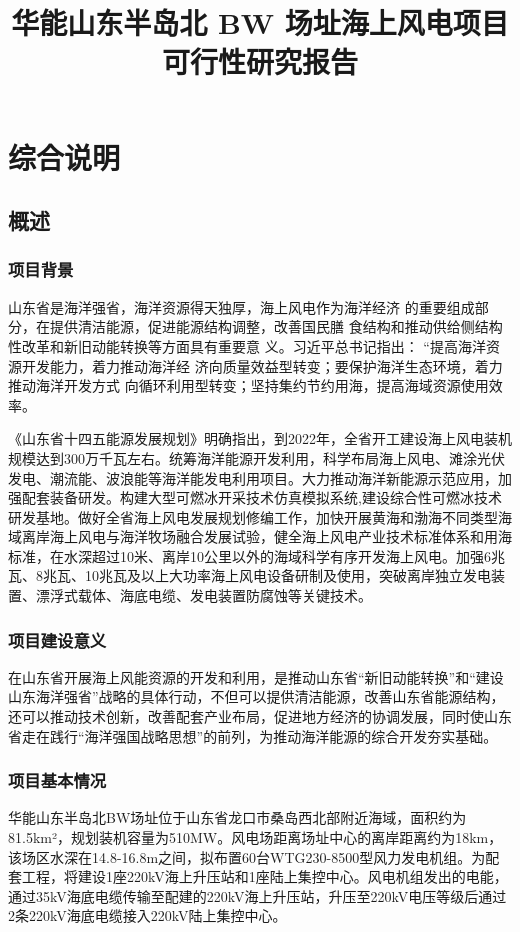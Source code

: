 \documentclass[12pt, letterpaper]{article}
\title{ \textbf{华能山东半岛北 BW 场址海上风电项目} \\
	可行性研究报告}
\begin{document}
	
	\maketitle
	
	\tableofcontents
	
	\section{综合说明}
	\subsection{概述}
	\subsubsection{项目背景}
	山东省是海洋强省，海洋资源得天独厚，海上风电作为海洋经济
	的重要组成部分，在提供清洁能源，促进能源结构调整，改善国民膳
	食结构和推动供给侧结构性改革和新旧动能转换等方面具有重要意
	义。习近平总书记指出： “提高海洋资源开发能力，着力推动海洋经
	济向质量效益型转变；要保护海洋生态环境，着力推动海洋开发方式
	向循环利用型转变；坚持集约节约用海，提高海域资源使用效率。
	
	
	《山东省十四五能源发展规划》明确指出，到2022年，全省开工建设海上风电装机规模达到300万千瓦左右。统筹海洋能源开发利用，科学布局海上风电、滩涂光伏发电、潮流能、波浪能等海洋能发电利用项目。大力推动海洋新能源示范应用，加强配套装备研发。构建大型可燃冰开采技术仿真模拟系统,建设综合性可燃冰技术研发基地。做好全省海上风电发展规划修编工作，加快开展黄海和渤海不同类型海域离岸海上风电与海洋牧场融合发展试验，健全海上风电产业技术标准体系和用海标准，在水深超过10米、离岸10公里以外的海域科学有序开发海上风电。加强6兆瓦、8兆瓦、10兆瓦及以上大功率海上风电设备研制及使用，突破离岸独立发电装置、漂浮式载体、海底电缆、发电装置防腐蚀等关键技术。
	
	\subsubsection{项目建设意义}
	在山东省开展海上风能资源的开发和利用，是推动山东省“新旧动能转换”和“建设山东海洋强省”战略的具体行动，不但可以提供清洁能源，改善山东省能源结构，还可以推动技术创新，改善配套产业布局，促进地方经济的协调发展，同时使山东省走在践行“海洋强国战略思想”的前列，为推动海洋能源的综合开发夯实基础。
	
	\subsubsection{项目基本情况}
	华能山东半岛北BW场址位于山东省龙口市桑岛西北部附近海域，面积约为81.5km²，规划装机容量为510MW。风电场距离场址中心的离岸距离约为18km，该场区水深在14.8-16.8m之间，拟布置60台WTG230-8500型风力发电机组。为配套工程，将建设1座220kV海上升压站和1座陆上集控中心。风电机组发出的电能，通过35kV海底电缆传输至配建的220kV海上升压站，升压至220kV电压等级后通过2条220kV海底电缆接入220kV陆上集控中心。
	
\end{document}
